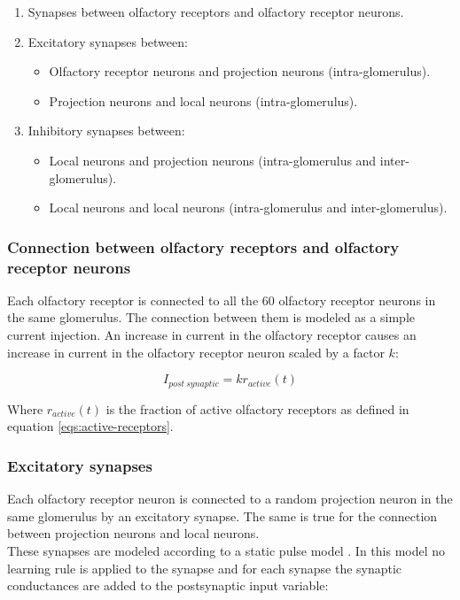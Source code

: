  \begin{enumerate}
    \item Synapses between olfactory receptors and olfactory receptor neurons.
    \item Excitatory synapses between:
      \begin{itemize}
        \item Olfactory receptor neurons and projection neurons (intra-glomerulus).
        \item Projection neurons and local neurons (intra-glomerulus).
      \end{itemize}
    \item Inhibitory synapses between:
      \begin{itemize}
        \item Local neurons and projection neurons (intra-glomerulus and inter-glomerulus).
        \item Local neurons and local neurons (intra-glomerulus and inter-glomerulus).
      \end{itemize}
  \end{enumerate}

    \subsubsection{Connection between olfactory receptors and olfactory receptor neurons}
    Each olfactory receptor is connected to all the $60$ olfactory receptor neurons in the same glomerulus.
    The connection between them is modeled as a simple current injection.
    An increase in current in the olfactory receptor causes an increase in current in the olfactory receptor neuron scaled by a factor $k$:

    \begin{equation}
      I_{post\ synaptic} = k r_{active}(t)
    \end{equation}

    Where $r_{active}(t)$ is the fraction of active olfactory receptors as defined in equation \ref{eqs:active-receptors}.

    \subsubsection{Excitatory synapses}
    Each olfactory receptor neuron is connected to a random projection neuron in the same glomerulus by an excitatory synapse.
    The same is true for the connection between projection neurons and local neurons.\\
    These synapses are modeled according to a static pulse model \cite{pre-synapses}.
    In this model no learning rule is applied to the synapse and for each synapse the synaptic conductances are added to the postsynaptic input variable:

